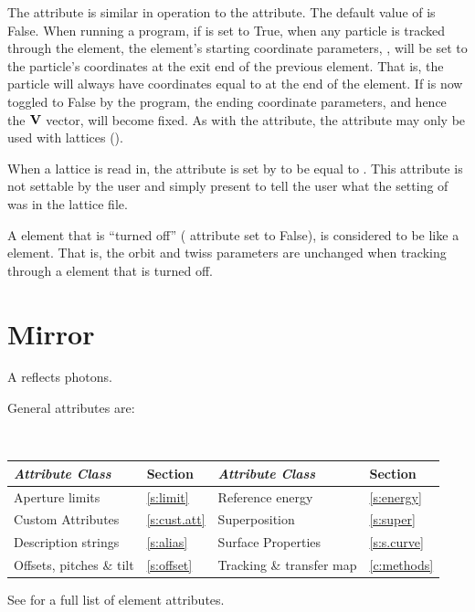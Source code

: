 {\begin{description}
  \item[match_end_orbit, match_end_orbit_input] \Newline
The  attribute is similar in operation to the 
attribute. The default value of  is False. When
running a program, if  is set to True, when any
particle is tracked through the  element, the 
element's starting coordinate parameters, , will be set to the particle's coordinates at the exit end of
the previous element. That is, the particle will always have
coordinates equal to  at the end of
the  element.  If  is now toggled to
False by the program, the ending coordinate parameters, and hence the
${\bf V}$ vector, will become fixed. As with the 
attribute, the  attribute may only be used with
 lattices ().

When a lattice is read in, the  attribute is set by \bmad to be
equal to . This attribute is not settable by the user and simply
present to tell the user what the setting of  was in the lattice file.


\end{description}

A  element that is ``turned off'' ( attribute set
to False), is considered to be like a  element. That is,
the orbit and twiss parameters are unchanged when tracking through
a  element that is turned off.

\section{Mirror}
\label{s:mirror}

A  reflects photons. 

General  attributes are:
\begin{center}
\tt 
\begin{tabular}{llll} \toprule
  {\sl Attribute Class}      & Section           & {\sl Attribute Class}      & Section         \\ \midrule
  Aperture limits            & \ref{s:limit}     & Reference energy           & \ref{s:energy}  \\
  Custom Attributes          & \ref{s:cust.att}  & Superposition              & \ref{s:super}   \\
  Description strings        & \ref{s:alias}     & Surface Properties         & \ref{s:s.curve} \\
  Offsets, pitches \& tilt   & \ref{s:offset}    & Tracking \& transfer map   & \ref{c:methods} \\ 
  \bottomrule
\end{tabular}
\end{center}
\toffset
See  for a full list of element attributes.

}
